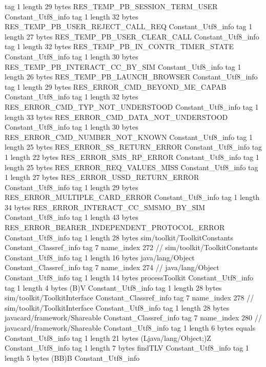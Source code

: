 {{{			tag	1
			length	29
			bytes	RES_TEMP_PB_SESSION_TERM_USER
		}
		Constant_Utf8_info {
			tag	1
			length	32
			bytes	RES_TEMP_PB_USER_REJECT_CALL_REQ
		}
		Constant_Utf8_info {
			tag	1
			length	27
			bytes	RES_TEMP_PB_USER_CLEAR_CALL
		}
		Constant_Utf8_info {
			tag	1
			length	32
			bytes	RES_TEMP_PB_IN_CONTR_TIMER_STATE
		}
		Constant_Utf8_info {
			tag	1
			length	30
			bytes	RES_TEMP_PB_INTERACT_CC_BY_SIM
		}
		Constant_Utf8_info {
			tag	1
			length	26
			bytes	RES_TEMP_PB_LAUNCH_BROWSER
		}
		Constant_Utf8_info {
			tag	1
			length	29
			bytes	RES_ERROR_CMD_BEYOND_ME_CAPAB
		}
		Constant_Utf8_info {
			tag	1
			length	32
			bytes	RES_ERROR_CMD_TYP_NOT_UNDERSTOOD
		}
		Constant_Utf8_info {
			tag	1
			length	33
			bytes	RES_ERROR_CMD_DATA_NOT_UNDERSTOOD
		}
		Constant_Utf8_info {
			tag	1
			length	30
			bytes	RES_ERROR_CMD_NUMBER_NOT_KNOWN
		}
		Constant_Utf8_info {
			tag	1
			length	25
			bytes	RES_ERROR_SS_RETURN_ERROR
		}
		Constant_Utf8_info {
			tag	1
			length	22
			bytes	RES_ERROR_SMS_RP_ERROR
		}
		Constant_Utf8_info {
			tag	1
			length	25
			bytes	RES_ERROR_REQ_VALUES_MISS
		}
		Constant_Utf8_info {
			tag	1
			length	27
			bytes	RES_ERROR_USSD_RETURN_ERROR
		}
		Constant_Utf8_info {
			tag	1
			length	29
			bytes	RES_ERROR_MULTIPLE_CARD_ERROR
		}
		Constant_Utf8_info {
			tag	1
			length	34
			bytes	RES_ERROR_INTERACT_CC_SMSMO_BY_SIM
		}
		Constant_Utf8_info {
			tag	1
			length	43
			bytes	RES_ERROR_BEARER_INDEPENDENT_PROTOCOL_ERROR
		}
		Constant_Utf8_info {
			tag	1
			length	28
			bytes	sim/toolkit/ToolkitConstants
		}
		Constant_Classref_info {
			tag	7
			name_index	272		// sim/toolkit/ToolkitConstants
		}
		Constant_Utf8_info {
			tag	1
			length	16
			bytes	java/lang/Object
		}
		Constant_Classref_info {
			tag	7
			name_index	274		// java/lang/Object
		}
		Constant_Utf8_info {
			tag	1
			length	14
			bytes	processToolkit
		}
		Constant_Utf8_info {
			tag	1
			length	4
			bytes	(B)V
		}
		Constant_Utf8_info {
			tag	1
			length	28
			bytes	sim/toolkit/ToolkitInterface
		}
		Constant_Classref_info {
			tag	7
			name_index	278		// sim/toolkit/ToolkitInterface
		}
		Constant_Utf8_info {
			tag	1
			length	28
			bytes	javacard/framework/Shareable
		}
		Constant_Classref_info {
			tag	7
			name_index	280		// javacard/framework/Shareable
		}
		Constant_Utf8_info {
			tag	1
			length	6
			bytes	equals
		}
		Constant_Utf8_info {
			tag	1
			length	21
			bytes	(Ljava/lang/Object;)Z
		}
		Constant_Utf8_info {
			tag	1
			length	7
			bytes	findTLV
		}
		Constant_Utf8_info {
			tag	1
			length	5
			bytes	(BB)B
		}
		Constant_Utf8_info {
}}}
